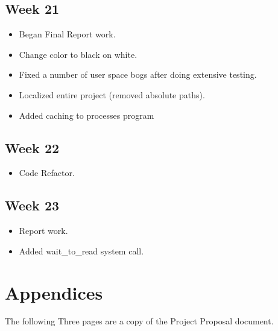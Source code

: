 \documentclass[a4paper]{report}
\begin{document}
\section*{Week 21}
\begin{itemize}
\item Began Final Report work.
\item Change color to black on white.
\item Fixed a number of user space bogs after doing extensive testing.
\item Localized entire project (removed absolute paths).
\item Added caching to processes program
\end{itemize}

\section*{Week 22}
\begin{itemize}
\item Code Refactor.
\end{itemize}

\section*{Week 23}
\begin{itemize}
\item Report work.
\item Added wait\_to\_read system call.
\end{itemize}

\chapter{Appendices}

The following Three pages are a copy of the Project Proposal document.








\end{document}
